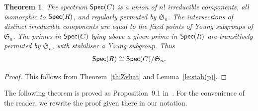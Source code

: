 \documentclass[12pt]{amsart}
\newcommand{\Spec}{\operatorname{\sf Spec}}
\newcommand{\sym}[1]{\mathfrak{S}_{#1}}
\numberwithin{equation}{section}
\newtheorem{theorem}[equation]{Theorem}
\theoremstyle{definition}
\begin{document}
\begin{theorem}\label{th:SpecC}
The spectrum $\Spec(C)$ is a union of $n!$ irreducible components, all
isomorphic to $\Spec(R)$, and regularly permuted by
$\sym{n}$. The intersections of distinct irreducible components are
equal to
the fixed points of Young subgroups of $\sym{n}$. The primes in $\Spec(C)$ lying
above a given prime in $\Spec(R)$ are transitively permuted
by $\sym{n}$, with stabiliser a Young subgroup. Thus
\[ \Spec(R)\cong\Spec(C)/\sym{n}. \]
\end{theorem}
\begin{proof}
This follows from Theorem~\ref{th:Zvhat}  and Lemma~\ref{le:stab(p)}.
\end{proof}

The following theorem is proved as Proposition~9.1
in~\cite{Lam:2006a}. For the convenience of the reader, we rewrite the
proof given there in our notation.
\end{document}

